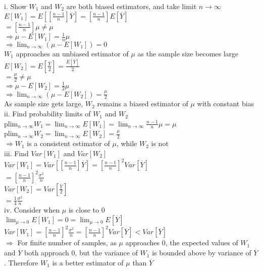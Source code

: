 \documentclass[11pt, oneside]{article}   	%
\begin{document}
i. Show $W_1$ and $W_2$ are both biased estimators, and take limit $n \rightarrow \infty$\\
$E[W_1]=E[[\frac{n-1}{n}]\overline{Y}]=[\frac{n-1}{n}]E[\overline{Y}]$\\
\indent$=[\frac{n-1}{n}]\mu\neq\mu$\\
\indent$\Rightarrow\mu-E[W_1]=\frac{1}{n}\mu$\\
\indent$\Rightarrow \lim_{n \rightarrow \infty} (\mu - E[W_1])= 0$\\
\indent$W_1$ approaches an unbiased estimator of $\mu$ as the sample size becomes large\\
$E[W_2]=E[\frac{\overline{Y}}{2}]=\frac{E[\overline{Y}]}{2}$\\
\indent$=\frac{\mu}{2}\neq\mu$\\
\indent$\Rightarrow \mu-E[W_2]=\frac{1}{2} \mu$\\
\indent$\Rightarrow \lim_{n \rightarrow \infty} (\mu-E[W_2])=\frac{\mu}{2}$\\
As sample size gets large, $W_2$ remains a biased estimator of $\mu$ with constant bias\\

ii. Find probability limits of $W_1$ and $W_2$\\
plim$_{n\rightarrow\infty}W_1=\lim_{n\rightarrow\infty}E[W_1]=\lim_{n\rightarrow\infty}\frac{n-1}{n}\mu=\mu$\\
plim$_{n\rightarrow\infty}W_2=\lim_{n\rightarrow\infty}E[W_2]=\frac{\mu}{2}$\\
\indent$\Rightarrow W_1$ is a consistent estimator of $\mu$, while $W_2$ is not\\

iii. Find $Var[W_1]$ and $Var[W_2]$\\
$Var[W_1]=Var[[\frac{n-1}{n}]\overline{Y}]=[\frac{n-1}{n}]^2Var[\overline{Y}]$\\
\indent$=[\frac{n-1}{n}]^2\frac{\sigma^2}{n}$\\
$Var[W_2]=Var[\frac{\overline{Y}}{2}]$\\
\indent$=\frac{1}{4}\frac{\sigma^2}{n}$\\

iv. Consider when $\mu$ is close to 0\\
\indent$\lim_{\mu\rightarrow 0}E[W_1]=0=\lim_{\mu\rightarrow 0} E[\overline{Y}]$\\
\indent$Var[W_1]=[\frac{n-1}{n}]^2\frac{\sigma^2}{n}=[\frac{n-1}{n}]^2 Var[\overline{Y}]<Var[\overline{Y}]$\\
$\Rightarrow$ For finite number of samples, as $\mu$ approaches 0, the expected values of $W_1$ and $\overline{Y}$ both approach 0, but the variance of $W_1$ is bounded above by variance of $\overline{Y}$. Therefore $W_1$ is a better estimator of $\mu$ than $\overline{Y}$
\end{document}
